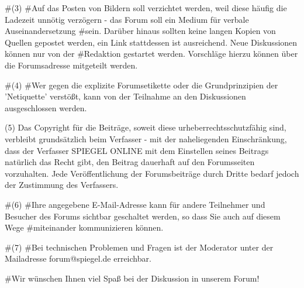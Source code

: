 #(3)
#Auf das Posten von Bildern soll verzichtet werden, weil diese häufig die Ladezeit unnötig verzögern - das Forum soll ein Medium für verbale Auseinandersetzung #sein. Darüber hinaus sollten keine langen Kopien von Quellen gepostet werden, ein Link stattdessen ist ausreichend. Neue Diskussionen können nur von der #Redaktion gestartet werden. Vorschläge hierzu können über die Forumsadresse mitgeteilt werden.

#(4)
#Wer gegen die explizite Forumsetikette oder die Grundprinzipien der 'Netiquette' verstößt, kann von der Teilnahme an den Diskussionen ausgeschlossen werden.

(5)
Das Copyright für die Beiträge, soweit diese urheberrechtsschutzfähig sind, verbleibt grundsätzlich beim Verfasser - mit der naheliegenden Einschränkung, dass der Verfasser SPIEGEL ONLINE mit dem Einstellen seines Beitrags natürlich das Recht gibt, den Beitrag dauerhaft auf den Forumsseiten vorzuhalten. Jede Veröffentlichung der Forumsbeiträge durch Dritte bedarf jedoch der Zustimmung des Verfassers.

#(6)
#Ihre angegebene E-Mail-Adresse kann für andere Teilnehmer und Besucher des Forums sichtbar geschaltet werden, so dass Sie auch auf diesem Wege #miteinander kommunizieren können.

#(7)
#Bei technischen Problemen und Fragen ist der Moderator unter der Mailadresse forum@spiegel.de erreichbar.

#Wir wünschen Ihnen viel Spaß bei der Diskussion in unserem Forum!